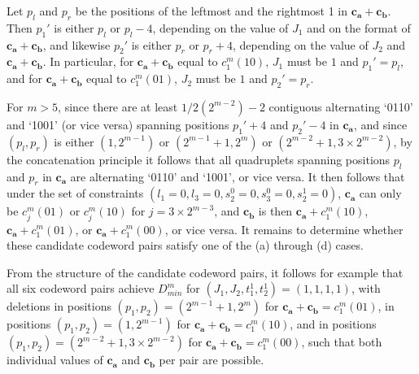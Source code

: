 Let $p_l$ and $p_r$ be the positions of the leftmost and the
rightmost 1 in $\mathbf{c_a}+\mathbf{c_b}$. %
Then $p_1'$ is either $p_l$ or $p_l-4$, depending on the value of
$J_1$ and on the format of $\mathbf{c_a}+\mathbf{c_b}$, and
likewise $p_2'$ is either $p_r$ or $p_r+4$, depending on the value
of $J_2$ and $\mathbf{c_a}+\mathbf{c_b}$. In particular, for
$\mathbf{c_a}+\mathbf{c_b}$ equal to $c_1^m(10)$, $J_1$ must be
$1$ and $p_1'=p_l$, and for $\mathbf{c_a}+\mathbf{c_b}$ equal to
$c_1^m(01)$, $J_2$ must be $1$ and $p_2'=p_r$.

For $m>5$, since there are at least $1/2(2^{m-2})-2$ contiguous
alternating `0110' and `1001' (or vice versa) spanning positions
$p_1'+4$ and $p_2'-4$ in $\mathbf{c_a}$, and since $(p_l,p_r)$ is
either $(1,2^{m-1})$ or $(2^{m-1}+1,2^m)$ or $(2^{m-2}+1,3\times
2^{m-2})$, by the concatenation principle it follows that all
quadruplets spanning positions $p_l$ and $p_r$ in $\mathbf{c_a}$
are alternating `0110' and `1001', or vice versa. It then follows
that under the set of constraints $(l_1=0, l_3=0,
s_2^0=0,s_3^0=0,s_2^1=0)$, $\mathbf{c_a}$ can only be $c_j^m(01)$
or $c_j^m(10)$ for $j=3\times 2^{m-3}$, and $\mathbf{c_b}$ is then
$\mathbf{c_a}+c_1^m(10)$, $\mathbf{c_a}+c_1^m(01)$, or
$\mathbf{c_a}+c_1^m(00)$, or vice versa. It remains to determine
whether these candidate codeword pairs satisfy one of the (a)
through (d) cases.

From the structure of the candidate codeword pairs, it follows for
example that all six codeword pairs achieve $D_{min}^m$ for
$(J_1,J_2,t_1^1,t_2^1)=(1,1,1,1)$, with deletions in positions
$(p_1,p_2)=(2^{m-1}+1,2^m)$ for
$\mathbf{c_a}+\mathbf{c_b}=c_1^m(01)$, in positions $(p_1,p_2)=(1,
2^{m-1})$ for $\mathbf{c_a}+\mathbf{c_b}=c_1^m(10)$, and in
positions $(p_1,p_2)=(2^{m-2}+1, 3 \times 2^{m-2})$ for
$\mathbf{c_a}+\mathbf{c_b}=c_1^m(00)$, such that both individual
values of $\mathbf{c_a}$ and $\mathbf{c_b}$ per pair are possible.





